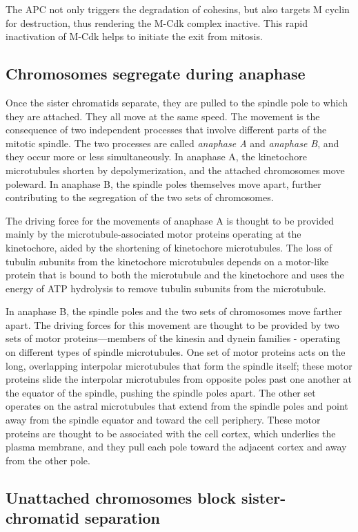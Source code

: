 The APC not only triggers the degradation of cohesins, but also targets
M cyclin for destruction, thus rendering the M-Cdk complex inactive. This
rapid inactivation of M-Cdk helps to initiate the exit from mitosis.

\subsection{Chromosomes segregate during anaphase}

Once the sister chromatids separate, they are pulled to the spindle pole to
which they are attached. They all move at the same speed.
The movement is the consequence of two
independent processes that involve different parts of the mitotic spindle.
The two processes are called \textit{anaphase A} and \textit{anaphase B}, and they occur
more or less simultaneously. In anaphase A, the kinetochore microtubules
shorten by depolymerization, and the attached chromosomes
move poleward. In anaphase B, the spindle poles themselves move apart,
further contributing to the segregation of the two sets of chromosomes.

The driving force for the movements of anaphase A is thought to be provided
mainly by the microtubule-associated motor proteins operating at
the kinetochore, aided by the shortening of kinetochore microtubules.
The loss of tubulin subunits from the kinetochore microtubules depends
on a motor-like protein that is bound to both the microtubule and the
kinetochore and uses the energy of ATP hydrolysis to remove tubulin subunits
from the microtubule.

In anaphase B, the spindle poles and the two sets of chromosomes move
farther apart. The driving forces for this movement are thought to be provided
by two sets of motor proteins—members of the kinesin and dynein
families - operating on different types of spindle microtubules.
One set of motor proteins acts on the long, overlapping
interpolar microtubules that form the spindle itself; these motor proteins
slide the interpolar microtubules from opposite poles past one another at
the equator of the spindle, pushing the spindle poles apart. The other set
operates on the astral microtubules that extend from the spindle poles
and point away from the spindle equator and toward the cell periphery.
These motor proteins are thought to be associated with the cell cortex,
which underlies the plasma membrane, and they pull each pole toward
the adjacent cortex and away from the other pole.

\subsection{Unattached chromosomes block sister-chromatid separation}

